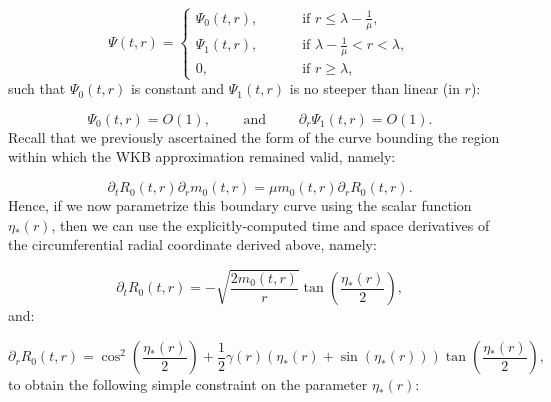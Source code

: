 \documentclass{article}
\begin{document}
\begin{equation}
\Psi \left( t, r \right) = \begin{cases}
\Psi_0 \left( t, r \right), \qquad &\text{ if } r \leq \lambda - \frac{1}{\mu},\\
\Psi_1 \left( t, r \right), \qquad &\text{ if } \lambda - \frac{1}{\mu} < r < \lambda,\\
0, \qquad &\text{ if } r \geq \lambda,
\end{cases}
\end{equation}
such that ${\Psi_0 \left( t, r \right)}$ is constant and ${\Psi_1 \left( t, r \right)}$ is no steeper than linear (in $r$):

\begin{equation}
\Psi_0 \left( t, r \right) = O \left( 1 \right), \qquad \text{ and } \qquad \partial_r \Psi_1 \left( t, r \right) = O \left( 1 \right).
\end{equation}
Recall that we previously ascertained the form of the curve bounding the region within which the WKB approximation remained valid, namely:

\begin{equation}
\partial_t R_0 \left( t, r \right) \partial_r m_0 \left( t, r \right) = \mu m_0 \left( t, r \right) \partial_r R_0 \left( t, r \right).
\end{equation}
Hence, if we now parametrize this boundary curve using the scalar function ${\eta_{*} \left( r \right)}$, then we can use the explicitly-computed time and space derivatives of the circumferential radial coordinate derived above, namely:

\begin{equation}
\partial_t R_0 \left( t, r \right) = - \sqrt{\frac{2 m_0 \left( t, r \right)}{r}} \tan \left( \frac{\eta_{*} \left( r \right)}{2} \right),
\end{equation}
and:

\begin{equation}
\partial_r R_0 \left( t, r \right) = \cos^2 \left( \frac{\eta_{*} \left( r \right)}{2} \right) + \frac{1}{2} \gamma \left( r \right) \left( \eta_{*} \left( r \right) + \sin \left( \eta_{*} \left( r \right) \right) \right) \tan \left( \frac{\eta_{*} \left( r \right)}{2} \right),
\end{equation}
to obtain the following simple constraint on the parameter ${\eta_{*} \left( r \right)}$:
\end{document}
